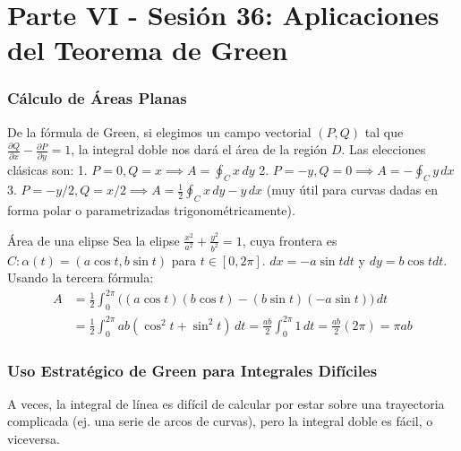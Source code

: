 \documentclass[11pt,a4paper]{article}
\begin{document}
\part*{Parte VI - Sesión 36: Aplicaciones del Teorema de Green}

\section{Cálculo de Áreas Planas}

De la fórmula de Green, si elegimos un campo vectorial $(P,Q)$ tal que $\frac{\partial Q}{\partial x} - \frac{\partial P}{\partial y} = 1$, la integral doble nos dará el área de la región $D$. Las elecciones clásicas son:
1. $P=0, Q=x \implies A = \oint_C x \, dy$
2. $P=-y, Q=0 \implies A = - \oint_C y \, dx$
3. $P=-y/2, Q=x/2 \implies A = \frac{1}{2} \oint_C x \, dy - y \, dx$ (muy útil para curvas dadas en forma polar o parametrizadas trigonométricamente).

\begin{ejemplobox}{Área de una elipse}
Sea la elipse $\frac{x^2}{a^2} + \frac{y^2}{b^2} = 1$, cuya frontera es $C: \alpha(t) = (a\cos t, b\sin t)$ para $t \in [0, 2\pi]$.
$dx = -a\sin t dt$ y $dy = b\cos t dt$.
Usando la tercera fórmula:
\begin{align*}
A &= \frac{1}{2} \int_0^{2\pi} \Big( (a\cos t)(b\cos t) - (b\sin t)(-a\sin t) \Big) \, dt \\
&= \frac{1}{2} \int_0^{2\pi} ab (\cos^2 t + \sin^2 t) \, dt = \frac{ab}{2} \int_0^{2\pi} 1 \, dt = \frac{ab}{2} (2\pi) = \pi ab
\end{align*}
\end{ejemplobox}

\section{Uso Estratégico de Green para Integrales Difíciles}

A veces, la integral de línea es difícil de calcular por estar sobre una trayectoria complicada (ej. una serie de arcos de curvas), pero la integral doble es fácil, o viceversa.
\end{document}
